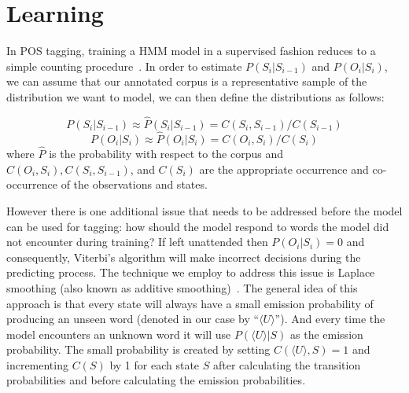 \section{Learning}
\label{sec:learning}
In POS tagging, training a HMM model in a supervised fashion reduces to a simple counting procedure~\cite{nlpBook}. In order to estimate $P( S_i | S_{i-1} )$ and $P( O_i | S_i )$, we can assume that our annotated corpus is a representative sample of the distribution we want to model, we can then define the distributions as follows:

\vspace{-1em}
\begin{equation}
P( S_i | S_{i-1} ) \approx \hat{P}( S_i | S_{i-1} ) = C( S_i, S_{i-1} )/C( S_{i-1} )
\end{equation}
\vspace{-1em}
\begin{equation}
P( O_i | S_i ) \approx \hat{P}( O_i | S_i ) = C( O_i, S_i )/C( S_i )
\end{equation}
where $\hat{P}$ is the probability with respect to the corpus and $C( O_i, S_i ), C( S_i, S_{i-1} )$, and $C( S_i )$ are the appropriate occurrence and co-occurrence of the observations and states.

However there is one additional issue that needs to be addressed before the model can be used for tagging: how should the model respond to words the model did not encounter during training? If left unattended then $P( O_i | S_i ) = 0$ and consequently, Viterbi's algorithm will make incorrect decisions during the predicting process. The technique we employ to address this issue is Laplace smoothing (also known as additive smoothing)~\cite{laplaceSmooth}. The general idea of this approach is that every state will always have a small emission probability of producing an unseen word (denoted in our case by ``$\langle U \rangle $''). And every time the model encounters an unknown word it will use $P(\langle U \rangle| S )$ as the emission probability. The small probability is created by setting $C(\langle U \rangle, S ) = 1$ and incrementing $C( S )$ by 1 for each state $S$ after calculating the transition probabilities and before calculating the emission probabilities.

